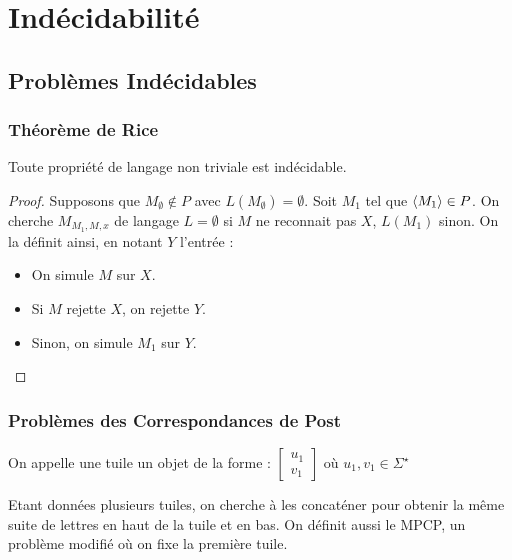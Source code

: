 \documentclass{cours}
\begin{document}
\section{Indécidabilité}
\subsection{Problèmes Indécidables}
\subsubsection{Théorème de Rice}
\begin{theorem}[Rice]
    Toute propriété de langage non triviale est indécidable.
\end{theorem}

\begin{proof}
    Supposons que $M_{\emptyset} \notin P$ avec $L\left(M_{\emptyset}\right) = \emptyset$. Soit $M_{1}$ tel que $\left\langle M_{1} \right\rangle \in P$. On cherche $M_{M_{1}, M, x}$ de langage $L = \emptyset$ si $M$ ne reconnait pas $X$, $L(M_{1})$ sinon. On la définit ainsi, en notant $Y$ l'entrée : \\
    \begin{itemize}
        \item On simule $M$ sur $X$.
        \item Si $M$ rejette $X$, on rejette $Y$.
        \item Sinon, on simule $M_{1}$ sur $Y$. 
    \end{itemize}
\end{proof}

\subsubsection{Problèmes des Correspondances de Post}
\begin{definition}
    On appelle une tuile un objet de la forme : $\left[\begin{array}{c}u_{1} \\ v_{1} \end{array}\right]$ où $u_{1}, v_{1} \in \Sigma^{\star}$ 
\end{definition}

\begin{definition}[$PCP$]
    Etant données plusieurs tuiles, on cherche à les concaténer pour obtenir la même suite de lettres en haut de la tuile et en bas. On définit aussi le MPCP, un problème modifié où on fixe la première tuile.
\end{definition}
\end{document}
